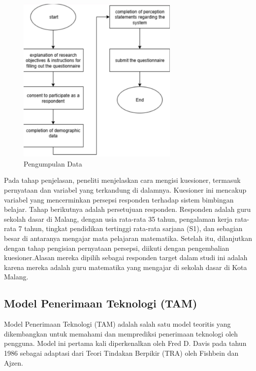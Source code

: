     \begin{figure}[H]
        \centering
        \includegraphics[width=0.7\textwidth]{Gambar/gambar7.2.png}
        \caption{Pengumpulan Data}
    \end{figure}

    Pada tahap penjelasan, peneliti menjelaskan cara mengisi kuesioner, termasuk pernyataan dan variabel yang terkandung di dalamnya. Kuesioner ini mencakup variabel yang mencerminkan persepsi responden terhadap sistem bimbingan belajar. Tahap berikutnya adalah persetujuan responden. Responden adalah guru sekolah dasar di Malang, dengan usia rata-rata 35 tahun, pengalaman kerja rata-rata 7 tahun, tingkat pendidikan tertinggi rata-rata sarjana (S1), dan sebagian besar di antaranya mengajar mata pelajaran matematika. Setelah itu, dilanjutkan dengan tahap pengisian pernyataan persepsi, diikuti dengan pengembalian kuesioner.Alasan mereka dipilih sebagai responden target dalam studi ini adalah karena mereka adalah guru matematika yang mengajar di sekolah dasar di Kota Malang.

\subsection{Model Penerimaan Teknologi (TAM)}

    Model Penerimaan Teknologi (TAM) adalah salah satu model teoritis yang dikembangkan untuk memahami dan memprediksi penerimaan teknologi oleh pengguna. Model ini pertama kali diperkenalkan oleh Fred D. Davis pada tahun 1986 sebagai adaptasi dari Teori Tindakan Berpikir (TRA) oleh Fishbein dan Ajzen.
    
